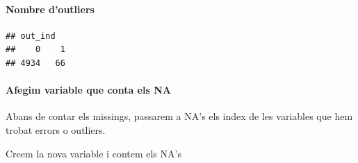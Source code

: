 \documentclass[
]{article}
\newenvironment{Shaded}{\begin{snugshade}}{\end{snugshade}}
\newcommand{\ConstantTok}[1]{\textcolor[rgb]{0.00,0.00,0.00}{#1}}
\newcommand{\ControlFlowTok}[1]{\textcolor[rgb]{0.13,0.29,0.53}{\textbf{#1}}}
\newcommand{\DecValTok}[1]{\textcolor[rgb]{0.00,0.00,0.81}{#1}}
\newcommand{\FunctionTok}[1]{\textcolor[rgb]{0.00,0.00,0.00}{#1}}
\newcommand{\NormalTok}[1]{#1}
\newcommand{\OtherTok}[1]{\textcolor[rgb]{0.56,0.35,0.01}{#1}}
\newcommand{\SpecialCharTok}[1]{\textcolor[rgb]{0.00,0.00,0.00}{#1}}
\begin{document}
\hypertarget{nombre-doutliers-1}{%
\paragraph{Nombre d'outliers}\label{nombre-doutliers-1}}

\begin{Shaded}
\end{Shaded}

\begin{verbatim}
## out_ind
##    0    1 
## 4934   66
\end{verbatim}

\hypertarget{afegim-variable-que-conta-els-na}{%
\paragraph{Afegim variable que conta els
NA}\label{afegim-variable-que-conta-els-na}}

Abans de contar els missings, passarem a NA's els index de les variables
que hem trobat errors o outliers.

\begin{Shaded}
\end{Shaded}

Creem la nova variable i contem els NA's

\begin{Shaded}
\end{Shaded}
\end{document}
